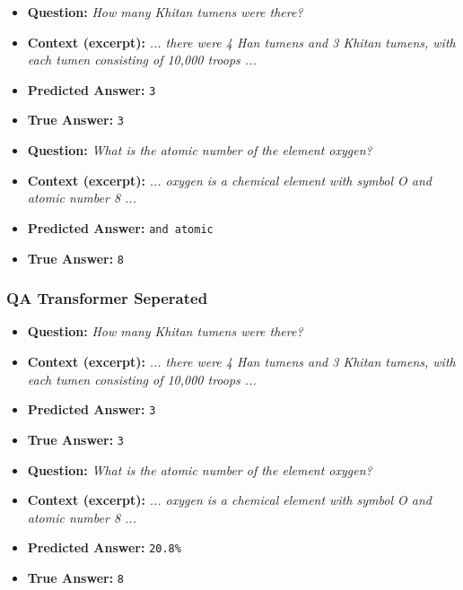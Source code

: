 \documentclass[runningheads]{llncs}
\begin{document}
\begin{itemize}
  \item \textbf{Question:} \textit{How many Khitan tumens were there?}
  \item \textbf{Context (excerpt):} \textit{... there were 4 Han tumens and 3 Khitan tumens, with each tumen consisting of 10,000 troops ...}
  \item \textbf{Predicted Answer:} \texttt{3}
  \item \textbf{True Answer:} \texttt{3}
\end{itemize}
\begin{itemize}
  \item \textbf{Question:} \textit{What is the atomic number of the element oxygen?}
  \item \textbf{Context (excerpt):} \textit{... oxygen is a chemical element with symbol O and atomic number 8 ...}
  \item \textbf{Predicted Answer:} \texttt{and atomic}
  \item \textbf{True Answer:} \texttt{8}
\end{itemize}

\subsubsection{QA Transformer Seperated}

\begin{itemize}
  \item \textbf{Question:} \textit{How many Khitan tumens were there?}
  \item \textbf{Context (excerpt):} \textit{... there were 4 Han tumens and 3 Khitan tumens, with each tumen consisting of 10,000 troops ...}
  \item \textbf{Predicted Answer:} \texttt{3}
  \item \textbf{True Answer:} \texttt{3}
\end{itemize}

\begin{itemize}
  \item \textbf{Question:} \textit{What is the atomic number of the element oxygen?}
  \item \textbf{Context (excerpt):} \textit{... oxygen is a chemical element with symbol O and atomic number 8 ...}
  \item \textbf{Predicted Answer:} \texttt{20.8\%}
  \item \textbf{True Answer:} \texttt{8}
\end{itemize}
\end{document}
